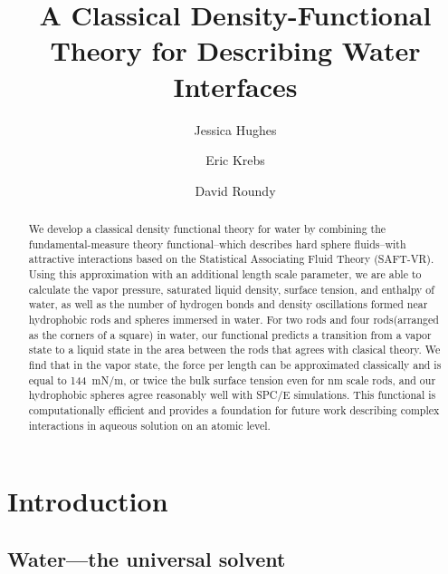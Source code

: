 \documentclass[letterpaper,twocolumn,amsmath,amssymb,prb]{revtex4-1}
\begin{document}
\title{A Classical Density-Functional Theory for Describing Water Interfaces}

\author{Jessica Hughes}
\author{Eric Krebs}
\author{David Roundy}

\begin{abstract}
{We develop a classical density functional theory for water by combining the
fundamental-measure theory functional--which describes hard sphere fluids--with
attractive interactions based on the Statistical Associating Fluid Theory
(SAFT-VR). Using this approximation with an additional length scale parameter, we are able to calculate the vapor pressure, saturated liquid density, surface tension, and enthalpy of water, as well as the number of hydrogen bonds and density oscillations formed near hydrophobic rods and spheres immersed in water. 
For two rods and four rods(arranged as the corners of a square) in water, our functional predicts
a transition from a vapor state to a liquid state in the area between
the rods that agrees with clasical theory.   We find that in the vapor state, the force per length can be
approximated classically and is equal to 144~mN/m, or twice the bulk surface 
tension even for nm scale rods, and  our hydrophobic spheres agree
reasonably well with SPC/E simulations.
This functional is computationally efficient and provides a foundation for 
future work describing complex interactions in aqueous solution on an
atomic level.}
\tableofcontents
\end{abstract}
\maketitle

\section{Introduction}

\subsection{Water---the universal solvent}
\end{document}
